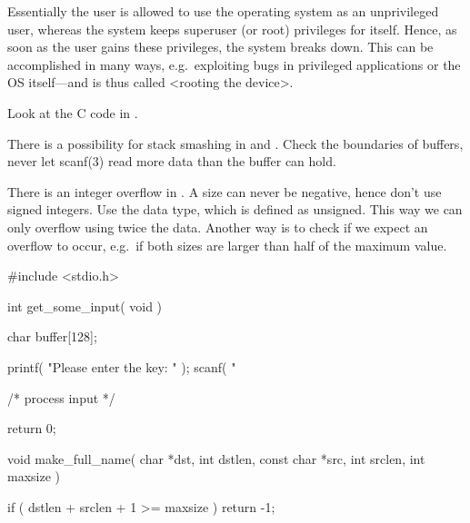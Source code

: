 \documentclass[svv,addpoints]{miunexam}
\begin{document}
\begin{questions}
\begin{solution}
    Essentially the user is allowed to use the operating system as an 
    unprivileged user, whereas the system keeps superuser (or root) privileges 
    for itself.
    Hence, as soon as the user gains these privileges, the system breaks down.
    This can be accomplished in many ways, e.g.~exploiting bugs in privileged 
    applications or the OS itself---and is thus called <rooting the device>.
  \end{solution}


  \question\label{q:software:stacksmash:C}
  Look at the C code in .
  \begin{solution}
    There is a possibility for stack smashing in  and 
    .
    Check the boundaries of buffers, never let scanf(3) read more data than the 
    buffer can hold.

    There is an integer overflow in .
    A size can never be negative, hence don't use signed integers.
    Use the  data type, which is defined as unsigned.
    This way we can only overflow using twice the data.
    Another way is to check if we expect an overflow to occur, e.g.~if both 
    sizes are larger than half of the maximum value.
  \end{solution}

  \begin{src}[float,caption={Some vulnerable C code.},label={lst:overrun}]
#include <stdio.h>

int
get_some_input( void )
{
  char buffer[128];

  printf( "Please enter the key: " );
  scanf( "%

  /* process input */

  return 0;
}

void
make_full_name( char *dst, int dstlen,
                const char *src, int srclen,
                int maxsize )
{
  if ( dstlen + srclen + 1 >= maxsize )
    return -1;

}
\end{src}
\end{questions}
\end{document}
